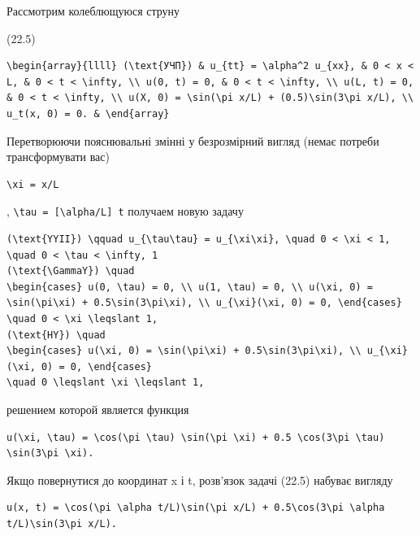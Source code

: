 \documentclass[
  ukrainian,
]{article}
\begin{document}
Рассмотрим колеблющуюся струну

(22.5)

\begin{verbatim}
\begin{array}{llll} (\text{УЧП}) & u_{tt} = \alpha^2 u_{xx}, & 0 < x < L, & 0 < t < \infty, \\ u(0, t) = 0, & 0 < t < \infty, \\ u(L, t) = 0, & 0 < t < \infty, \\ u(X, 0) = \sin(\pi x/L) + (0.5)\sin(3\pi x/L), \\ u_t(x, 0) = 0. & \end{array}
\end{verbatim}

Перетворюючи пояснювальні змінні у безрозмірний вигляд (немає потреби
трансформувати вас)

\begin{verbatim}
\xi = x/L
\end{verbatim}

, \texttt{\textbackslash{}tau\ =\ {[}\textbackslash{}alpha/L{]}\ t}
получаем новую задачу

\begin{verbatim}
(\text{YYII}) \qquad u_{\tau\tau} = u_{\xi\xi}, \quad 0 < \xi < 1, \quad 0 < \tau < \infty, 1
(\text{\GammaY}) \quad
\begin{cases} u(0, \tau) = 0, \\ u(1, \tau) = 0, \\ u(\xi, 0) = \sin(\pi\xi) + 0.5\sin(3\pi\xi), \\ u_{\xi}(\xi, 0) = 0, \end{cases}
\quad 0 < \xi \leqslant 1,
(\text{HY}) \quad
\begin{cases} u(\xi, 0) = \sin(\pi\xi) + 0.5\sin(3\pi\xi), \\ u_{\xi}(\xi, 0) = 0, \end{cases}
\quad 0 \leqslant \xi \leqslant 1,
\end{verbatim}

решением которой является функция

\begin{verbatim}
u(\xi, \tau) = \cos(\pi \tau) \sin(\pi \xi) + 0.5 \cos(3\pi \tau) \sin(3\pi \xi).
\end{verbatim}

Якщо повернутися до координат x і t, розв'язок задачі (22.5) набуває
вигляду

\begin{verbatim}
u(x, t) = \cos(\pi \alpha t/L)\sin(\pi x/L) + 0.5\cos(3\pi \alpha t/L)\sin(3\pi x/L).
\end{verbatim}
\end{document}
